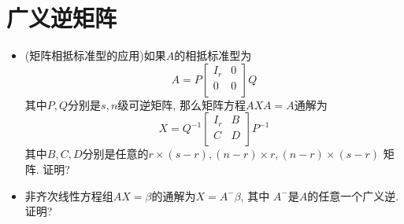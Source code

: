 \section{广义逆矩阵}
\begin{itemize}
\item (矩阵相抵标准型的应用)如果$A$的相抵标准型为
\begin{equation*}
	A = P\begin{bmatrix}
		I_r& 0\\
		0& 0\\
	\end{bmatrix}
	Q
\end{equation*}
其中$P,Q$分别是$s,n$级可逆矩阵,
那么矩阵方程$AXA=A$通解为
\begin{equation*}
	X = Q^{-1}\begin{bmatrix}
		I_r& B\\
		C& D\\
	\end{bmatrix}
	P^{-1}
\end{equation*}
其中$B,C,D$分别是任意的$r\times (s-r), (n-r)\times r, (n-r)\times (s-r)$
矩阵. 证明?

\item 非齐次线性方程组$AX=\beta$的通解为$X = A^{-}\beta$, 其中
$A^{-}$是$A$的任意一个广义逆. 证明?
\end{itemize}

